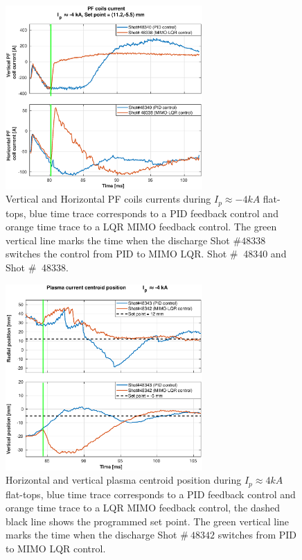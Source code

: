 \begin{figure}
	\centering
	\includegraphics[width=0.67\textwidth]{Chp5/PIDvsMIMO_340_338_curr_2.eps}
	\caption{ Vertical and Horizontal PF coils currents during  $I_p\approx -4kA$  flat-tops, blue time trace corresponds to a PID feedback control and orange time trace to a LQR MIMO feedback control. The green vertical line marks the time  when the  discharge Shot $\# 48338$ switches the control from PID to MIMO LQR. Shot $\#~$ 48340 and Shot $\#~$ 48338.}
\end{figure}

\begin{figure}
	\centering
	\includegraphics[width=0.67\textwidth]{Chp5/PIDvsMIMO_343_342_2.eps}
	\caption{Horizontal and vertical plasma centroid position during  $I_p\approx 4kA$  flat-tops, blue time trace corresponds to a PID feedback control and orange time trace to a LQR MIMO feedback control, the dashed black line shows the programmed set point. The green vertical line marks the time  when the  discharge Shot $\# ~48342$ switches  from PID to MIMO LQR control.}
\end{figure}


